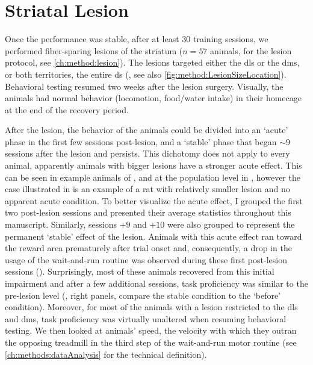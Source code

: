 \section{Striatal Lesion}
\label{ch:lesion:lesion}

Once the performance was stable, after at least 30 training sessions, we performed fiber-sparing lesions of the striatum ($n=57$ animals, for the lesion protocol, see \autoref{ch:method:lesion}).
The lesions targeted either the \gls{dls} or the \gls{dms}, or both territories, the entire \gls{ds} (, see also \autoref{fig:method:LesionSizeLocation}).
Behavioral testing resumed two weeks after the lesion surgery.
Visually, the animals had normal behavior (locomotion, food/water intake) in their homecage at the end of the recovery period.
\par
After the lesion, the behavior of the animals could be divided into an `acute' phase in the first few sessions post-lesion, and a `stable' phase that began $\sim$9 sessions after the lesion and persists.
This dichotomy does not apply to every animal, apparently animals with bigger lesions have a stronger acute effect.
This can be seen in example animals of , and at the population level in , however the case illustrated in  is an example of a rat with relatively smaller lesion and no apparent acute condition.
To better visualize the acute effect, I grouped the first two post-lesion sessions and presented their average statistics throughout this manuscript.
Similarly, sessions $+9$ and $+10$ were also grouped to represent the permanent `stable' effect of the lesion.
Animals with this acute effect ran toward the reward area prematurely after trial onset and, consequently, a drop in the usage of the wait-and-run routine was observed during these first post-lesion sessions ().
Surprisingly, most of these animals recovered from this initial impairment and after a few additional sessions, task proficiency was similar to the pre-lesion level (, right panels, compare the stable condition to the `before' condition).
Moreover, for most of the animals with a lesion restricted to the \gls{dls} and \gls{dms}, task proficiency was virtually unaltered when resuming behavioral testing.
We then looked at animals' speed, the velocity with which they outran the opposing treadmill in the third step of the wait-and-run motor routine (see \autoref{ch:methods:dataAnalysis} for the technical definition).
